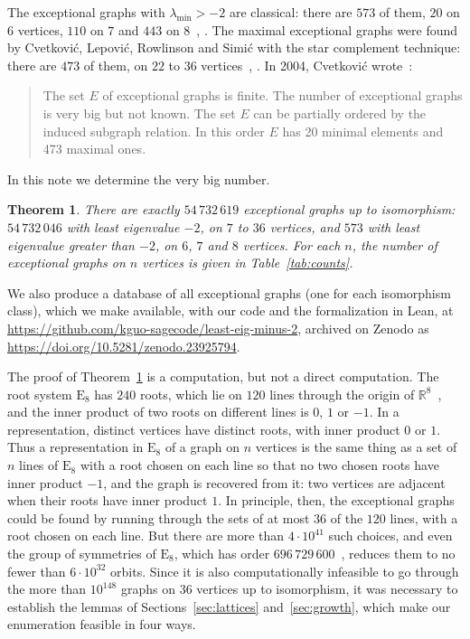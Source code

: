 \documentclass[11pt]{article}
\newcommand\re{{\mathbb R}}%
\newtheorem{theorem}{Theorem}[section]
\theoremstyle{definition}
\newcommand{\typ}[1]{\mathrm{#1}}
\newcommand{\lmin}{\lambda_{\min}}
\begin{document}
The exceptional graphs with $\lmin>-2$ are classical: there are $573$ of them, $20$ on $6$
vertices, $110$ on $7$ and $443$ on $8$~\cite[\S2.3 and Table~A2]{CRS04}, \cite{DC79}. The
maximal exceptional graphs were found by Cvetkovi\'c, Lepovi\'c, Rowlinson and Simi\'c with the
star complement technique: there are $473$ of them, on $22$ to $36$
vertices~\cite{CLRS02}, \cite[Chapter~6]{CRS04}. In 2004, Cvetkovi\'c wrote~\cite{Cve04}:
\begin{quote}
The set $E$ of exceptional graphs is finite. The number of exceptional graphs is very big but
not known. The set $E$ can be partially ordered by the induced subgraph relation. In this order
$E$ has 20 minimal elements and 473 maximal ones.
\end{quote}

In this note we determine the very big number.

\begin{theorem}\label{thm:count}
There are exactly $54\,732\,619$ exceptional graphs up to isomorphism: $54\,732\,046$ with
least eigenvalue $-2$, on $7$ to $36$ vertices, and $573$ with least eigenvalue greater than
$-2$, on $6$, $7$ and $8$ vertices. For each $n$, the number of exceptional graphs on $n$
vertices is given in Table~\ref{tab:counts}.
\end{theorem}

We also produce a database of all exceptional graphs (one for each isomorphism class), which we
make available, with our code and the formalization in Lean, at
\url{https://github.com/kguo-sagecode/least-eig-minus-2}, archived on Zenodo as
\url{https://doi.org/10.5281/zenodo.23925794}.

The proof of Theorem~\ref{thm:count} is a computation, but not a direct computation. The root
system $\typ E_8$ has $240$ roots, which lie on $120$ lines through the origin of
$\re^8$~\cite[Lemma~3.4]{CGSS}, and the inner product of two roots on different lines is $0$,
$1$ or $-1$. In a representation, distinct vertices have distinct roots, with inner product $0$
or $1$. Thus a representation in $\typ E_8$ of a graph on $n$ vertices is the same thing as a
set of $n$ lines of $\typ E_8$ with a root chosen on each line so that no two chosen roots have
inner product $-1$, and the graph is recovered from it: two vertices are adjacent when their
roots have inner product $1$. In principle, then, the exceptional graphs could be found by
running through the sets of at most $36$ of the $120$ lines, with a root chosen on each line. But
there are more than $4\cdot10^{41}$ such choices, and even the group of symmetries of
$\typ E_8$, which has order $696\,729\,600$~\cite[Chapter~4]{CS99}, reduces them to no fewer than
$6\cdot10^{32}$ orbits. Since it is also computationally infeasible to go through the more than
$10^{148}$ graphs on $36$ vertices up to isomorphism, it was necessary to establish the lemmas
of Sections~\ref{sec:lattices} and~\ref{sec:growth}, which make our enumeration feasible in four
ways.
\end{document}
